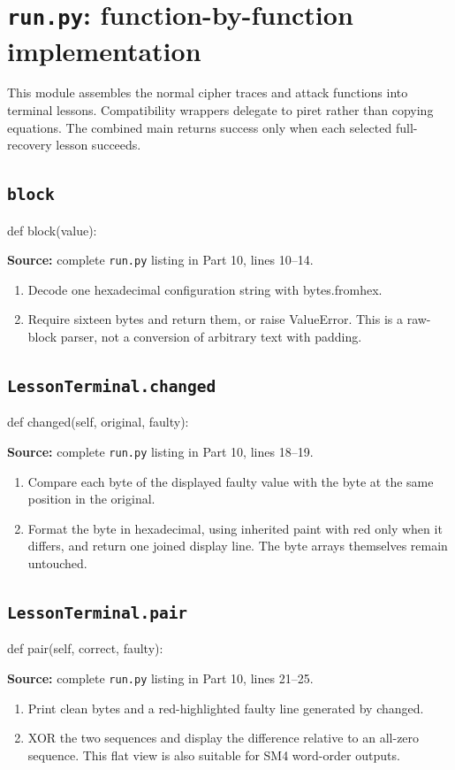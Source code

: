 \section{\texttt{run.py}: function-by-function implementation}
This module assembles the normal cipher traces and attack functions into terminal lessons. Compatibility wrappers delegate to piret rather than copying equations. The combined main returns success only when each selected full-recovery lesson succeeds.
\subsection{\texttt{block}}
\begin{lightcode}
def block(value):
\end{lightcode}
\noindent\textbf{Source:} complete \texttt{run.py} listing in Part 10, lines 10--14.
\begin{enumerate}
\item Decode one hexadecimal configuration string with bytes.fromhex.
\item Require sixteen bytes and return them, or raise ValueError. This is a raw-block parser, not a conversion of arbitrary text with padding.
\end{enumerate}
\subsection{\texttt{LessonTerminal.changed}}
\begin{lightcode}
def changed(self, original, faulty):
\end{lightcode}
\noindent\textbf{Source:} complete \texttt{run.py} listing in Part 10, lines 18--19.
\begin{enumerate}
\item Compare each byte of the displayed faulty value with the byte at the same position in the original.
\item Format the byte in hexadecimal, using inherited paint with red only when it differs, and return one joined display line. The byte arrays themselves remain untouched.
\end{enumerate}
\subsection{\texttt{LessonTerminal.pair}}
\begin{lightcode}
def pair(self, correct, faulty):
\end{lightcode}
\noindent\textbf{Source:} complete \texttt{run.py} listing in Part 10, lines 21--25.
\begin{enumerate}
\item Print clean bytes and a red-highlighted faulty line generated by changed.
\item XOR the two sequences and display the difference relative to an all-zero sequence. This flat view is also suitable for SM4 word-order outputs.
\end{enumerate}
